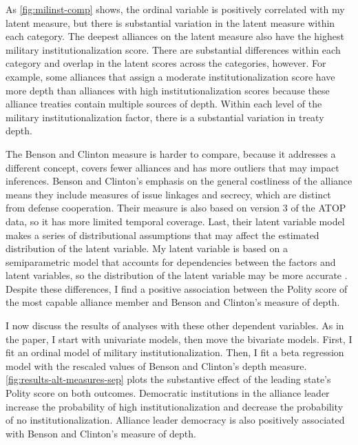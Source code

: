 \documentclass[12pt]{article}
\begin{document}
As \autoref{fig:milinst-comp} shows, the ordinal variable is positively correlated with my latent measure, but there is substantial variation in the latent measure within each category. 
The deepest alliances on the latent measure also have the highest military institutionalization score.
There are substantial differences within each category and overlap in the latent scores across the categories, however. 
For example, some alliances that \citet{LeedsAnac2005} assign a moderate institutionalization score have more depth than alliances with high institutionalization scores because these alliance treaties contain multiple sources of depth. 
Within each level of the military institutionalization factor, there is a substantial variation in treaty depth. 


The Benson and Clinton measure is harder to compare, because it addresses a different concept, covers fewer alliances and has more outliers that may impact inferences.
Benson and Clinton's emphasis on the general costliness of the alliance means they include measures of issue linkages and secrecy, which are distinct from defense cooperation. 
Their measure is also based on version 3 of the ATOP data, so it has more limited temporal coverage. 
Last, their latent variable model makes a series of distributional assumptions that may affect the estimated distribution of the latent variable. 
My latent variable is based on a semiparametric model that accounts for dependencies between the factors and latent variables, so the distribution of the latent variable may be more accurate \citep{Murrayetal2013}.
Despite these differences, I find a positive association between the Polity score of the most capable alliance member and Benson and Clinton's measure of depth. 


I now discuss the results of analyses with these other dependent variables. 
As in the paper, I start with univariate models, then move the bivariate models. 
First, I fit an ordinal model of military institutionalization. 
Then, I fit a beta regression model with the rescaled values of Benson and Clinton's depth measure. 
\autoref{fig:results-alt-measures-sep} plots the substantive effect of the leading state's Polity score on both outcomes. 
Democratic institutions in the alliance leader increase the probability of high institutionalization and decrease the probability of no institutionalization. 
Alliance leader democracy is also positively associated with Benson and Clinton's measure of depth. 
\end{document}
